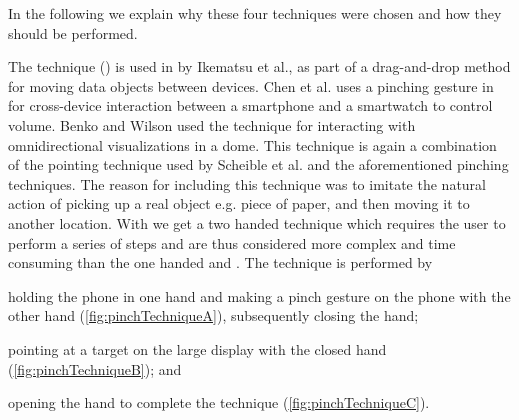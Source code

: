 In the following we explain why these four techniques were chosen and how they should be performed.

The \pinch technique () is used in \cite{Ikematsu:2015} by Ikematsu et al., as part of a drag-and-drop method for moving data objects between devices.
Chen et al. uses a pinching gesture in \cite{Chen:2014} for cross-device interaction between a smartphone and a smartwatch to control volume. 
Benko and Wilson \cite{Benko:2010} used the \pinch technique for interacting with omnidirectional visualizations in a dome.
This technique is again a combination of the pointing technique used by Scheible et al. \cite{Scheible:2008} and the aforementioned pinching techniques. 
The reason for including this technique was to imitate the natural action of picking up a real object e.g. piece of paper, and then moving it to another location.
With \pinch we get a two handed technique which requires the user to perform a series of steps and are thus considered more complex and time consuming  than the one handed \swipe and \tilt.
The \pinch technique is performed by 
\begin{enumerate*}[label=\itshape\arabic*\upshape)]
	\item{holding the phone in one hand and making a pinch gesture on the phone with the other hand (\cref{fig:pinchTechniqueA}), subsequently closing the hand;}
	\item{pointing at a target on the large display with the closed hand (\cref{fig:pinchTechniqueB}); and}
	\item{opening the hand to complete the technique (\cref{fig:pinchTechniqueC}).}
\end{enumerate*}

